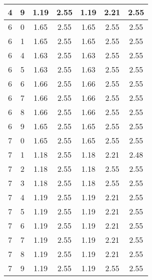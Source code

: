 \begin{longtable}{|c|c||c||c||c|c|c|}
	4 & 9 & 1.19 & 2.55 & 1.19 & 2.21 & 2.55 \\ \hline
	6 & 0 & 1.65 & 2.55 & 1.65 & 2.55 & 2.55 \\ \hline
	6 & 1 & 1.65 & 2.55 & 1.65 & 2.55 & 2.55 \\ \hline
	6 & 4 & 1.63 & 2.55 & 1.63 & 2.55 & 2.55 \\ \hline
	6 & 5 & 1.63 & 2.55 & 1.63 & 2.55 & 2.55 \\ \hline
	6 & 6 & 1.66 & 2.55 & 1.66 & 2.55 & 2.55 \\ \hline
	6 & 7 & 1.66 & 2.55 & 1.66 & 2.55 & 2.55 \\ \hline
	6 & 8 & 1.66 & 2.55 & 1.66 & 2.55 & 2.55 \\ \hline
	6 & 9 & 1.65 & 2.55 & 1.65 & 2.55 & 2.55 \\ \hline
	7 & 0 & 1.65 & 2.55 & 1.65 & 2.55 & 2.55 \\ \hline
	7 & 1 & 1.18 & 2.55 & 1.18 & 2.21 & 2.48 \\ \hline
	7 & 2 & 1.18 & 2.55 & 1.18 & 2.55 & 2.55 \\ \hline
	7 & 3 & 1.18 & 2.55 & 1.18 & 2.55 & 2.55 \\ \hline
	7 & 4 & 1.19 & 2.55 & 1.19 & 2.21 & 2.55 \\ \hline
	7 & 5 & 1.19 & 2.55 & 1.19 & 2.21 & 2.55 \\ \hline
	7 & 6 & 1.19 & 2.55 & 1.19 & 2.21 & 2.55 \\ \hline
	7 & 7 & 1.19 & 2.55 & 1.19 & 2.21 & 2.55 \\ \hline
	7 & 8 & 1.19 & 2.55 & 1.19 & 2.21 & 2.55 \\ \hline
	7 & 9 & 1.19 & 2.55 & 1.19 & 2.55 & 2.55 \\ \hline
\end{longtable}


